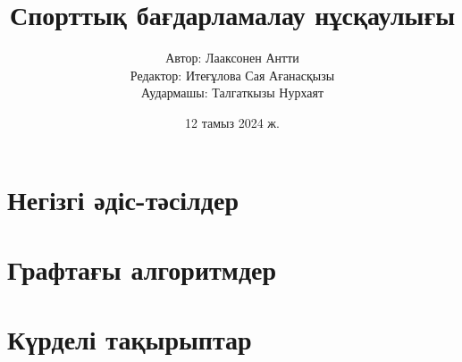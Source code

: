 \documentclass[oneside,12pt,a4paper,kazakh]{book}
\date{12 тамыз 2024 ж.}
\title{\Huge Спорттық бағдарламалау нұсқаулығы}
\author{\Large Автор: Лааксонен Антти \\
Редактор: Итеғұлова Сая Ағанасқызы
\\
Аудармашы: Талгаткызы Нурхаят
}
\begin{document}


\frontmatter
\maketitle
\setcounter{tocdepth}{1}
\tableofcontents







\mainmatter
{}
\setcounter{page}{1}

\newcommand{\key}[1] {\textbf{#1}}

\part{Негізгі әдіс-тәсілдер}










\part{Графтағы алгоритмдер}










\part{Күрделі тақырыптар}











\cleardoublepage
{}
{}


\cleardoublepage
\printindex
\end{document}
